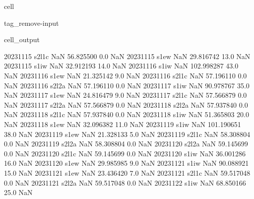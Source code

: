 \documentclass[letterpaper,10pt,english]{jupyterBook}
\begin{document}
\begin{sphinxuseclass}{cell}
\begin{sphinxuseclass}{tag_remove-input}
\begin{sphinxVerbatimOutput}
\begin{sphinxuseclass}{cell_output}
\begin{sphinxVerbatim}[commandchars=\\\{\}]
2023\PYGZhy{}11\PYGZhy{}15       s2\PYGZus{}l1c           NaN   56.825500     0.0         NaN
2023\PYGZhy{}11\PYGZhy{}15        s1\PYGZus{}ew           NaN   29.816742    13.0         NaN
2023\PYGZhy{}11\PYGZhy{}15        s1\PYGZus{}iw           NaN   32.912193    14.0         NaN
2023\PYGZhy{}11\PYGZhy{}16        s1\PYGZus{}iw           NaN  102.998287    43.0         NaN
2023\PYGZhy{}11\PYGZhy{}16        s1\PYGZus{}ew           NaN   21.325142     9.0         NaN
2023\PYGZhy{}11\PYGZhy{}16       s2\PYGZus{}l1c           NaN   57.196110     0.0         NaN
2023\PYGZhy{}11\PYGZhy{}16       s2\PYGZus{}l2a           NaN   57.196110     0.0         NaN
2023\PYGZhy{}11\PYGZhy{}17        s1\PYGZus{}iw           NaN   90.978767    35.0         NaN
2023\PYGZhy{}11\PYGZhy{}17        s1\PYGZus{}ew           NaN   24.816479     9.0         NaN
2023\PYGZhy{}11\PYGZhy{}17       s2\PYGZus{}l1c           NaN   57.566879     0.0         NaN
2023\PYGZhy{}11\PYGZhy{}17       s2\PYGZus{}l2a           NaN   57.566879     0.0         NaN
2023\PYGZhy{}11\PYGZhy{}18       s2\PYGZus{}l2a           NaN   57.937840     0.0         NaN
2023\PYGZhy{}11\PYGZhy{}18       s2\PYGZus{}l1c           NaN   57.937840     0.0         NaN
2023\PYGZhy{}11\PYGZhy{}18        s1\PYGZus{}iw           NaN   51.365803    20.0         NaN
2023\PYGZhy{}11\PYGZhy{}18        s1\PYGZus{}ew           NaN   32.096382    11.0         NaN
2023\PYGZhy{}11\PYGZhy{}19        s1\PYGZus{}iw           NaN  101.190651    38.0         NaN
2023\PYGZhy{}11\PYGZhy{}19        s1\PYGZus{}ew           NaN   21.328133     5.0         NaN
2023\PYGZhy{}11\PYGZhy{}19       s2\PYGZus{}l1c           NaN   58.308804     0.0         NaN
2023\PYGZhy{}11\PYGZhy{}19       s2\PYGZus{}l2a           NaN   58.308804     0.0         NaN
2023\PYGZhy{}11\PYGZhy{}20       s2\PYGZus{}l2a           NaN   59.145699     0.0         NaN
2023\PYGZhy{}11\PYGZhy{}20       s2\PYGZus{}l1c           NaN   59.145699     0.0         NaN
2023\PYGZhy{}11\PYGZhy{}20        s1\PYGZus{}iw           NaN   36.001286    16.0         NaN
2023\PYGZhy{}11\PYGZhy{}20        s1\PYGZus{}ew           NaN   29.985985     9.0         NaN
2023\PYGZhy{}11\PYGZhy{}21        s1\PYGZus{}iw           NaN   90.088921    15.0         NaN
2023\PYGZhy{}11\PYGZhy{}21        s1\PYGZus{}ew           NaN   23.436420     7.0         NaN
2023\PYGZhy{}11\PYGZhy{}21       s2\PYGZus{}l1c           NaN   59.517048     0.0         NaN
2023\PYGZhy{}11\PYGZhy{}21       s2\PYGZus{}l2a           NaN   59.517048     0.0         NaN
2023\PYGZhy{}11\PYGZhy{}22        s1\PYGZus{}iw           NaN   68.850166    25.0         NaN

\end{sphinxVerbatim}
\end{sphinxuseclass}
\end{sphinxVerbatimOutput}
\end{sphinxuseclass}
\end{sphinxuseclass}
\end{document}
